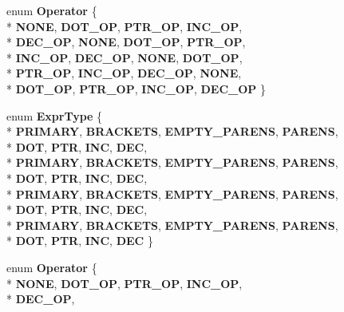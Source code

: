 \begin{DoxyCompactItemize}
enum {\bfseries Operator} \{ \\*
{\bfseries N\-O\-N\-E}, 
{\bfseries D\-O\-T\-\_\-\-O\-P}, 
{\bfseries P\-T\-R\-\_\-\-O\-P}, 
{\bfseries I\-N\-C\-\_\-\-O\-P}, 
\\*
{\bfseries D\-E\-C\-\_\-\-O\-P}, 
{\bfseries N\-O\-N\-E}, 
{\bfseries D\-O\-T\-\_\-\-O\-P}, 
{\bfseries P\-T\-R\-\_\-\-O\-P}, 
\\*
{\bfseries I\-N\-C\-\_\-\-O\-P}, 
{\bfseries D\-E\-C\-\_\-\-O\-P}, 
{\bfseries N\-O\-N\-E}, 
{\bfseries D\-O\-T\-\_\-\-O\-P}, 
\\*
{\bfseries P\-T\-R\-\_\-\-O\-P}, 
{\bfseries I\-N\-C\-\_\-\-O\-P}, 
{\bfseries D\-E\-C\-\_\-\-O\-P}, 
{\bfseries N\-O\-N\-E}, 
\\*
{\bfseries D\-O\-T\-\_\-\-O\-P}, 
{\bfseries P\-T\-R\-\_\-\-O\-P}, 
{\bfseries I\-N\-C\-\_\-\-O\-P}, 
{\bfseries D\-E\-C\-\_\-\-O\-P}
 \}
\item 
enum {\bfseries Expr\-Type} \{ \\*
{\bfseries P\-R\-I\-M\-A\-R\-Y}, 
{\bfseries B\-R\-A\-C\-K\-E\-T\-S}, 
{\bfseries E\-M\-P\-T\-Y\-\_\-\-P\-A\-R\-E\-N\-S}, 
{\bfseries P\-A\-R\-E\-N\-S}, 
\\*
{\bfseries D\-O\-T}, 
{\bfseries P\-T\-R}, 
{\bfseries I\-N\-C}, 
{\bfseries D\-E\-C}, 
\\*
{\bfseries P\-R\-I\-M\-A\-R\-Y}, 
{\bfseries B\-R\-A\-C\-K\-E\-T\-S}, 
{\bfseries E\-M\-P\-T\-Y\-\_\-\-P\-A\-R\-E\-N\-S}, 
{\bfseries P\-A\-R\-E\-N\-S}, 
\\*
{\bfseries D\-O\-T}, 
{\bfseries P\-T\-R}, 
{\bfseries I\-N\-C}, 
{\bfseries D\-E\-C}, 
\\*
{\bfseries P\-R\-I\-M\-A\-R\-Y}, 
{\bfseries B\-R\-A\-C\-K\-E\-T\-S}, 
{\bfseries E\-M\-P\-T\-Y\-\_\-\-P\-A\-R\-E\-N\-S}, 
{\bfseries P\-A\-R\-E\-N\-S}, 
\\*
{\bfseries D\-O\-T}, 
{\bfseries P\-T\-R}, 
{\bfseries I\-N\-C}, 
{\bfseries D\-E\-C}, 
\\*
{\bfseries P\-R\-I\-M\-A\-R\-Y}, 
{\bfseries B\-R\-A\-C\-K\-E\-T\-S}, 
{\bfseries E\-M\-P\-T\-Y\-\_\-\-P\-A\-R\-E\-N\-S}, 
{\bfseries P\-A\-R\-E\-N\-S}, 
\\*
{\bfseries D\-O\-T}, 
{\bfseries P\-T\-R}, 
{\bfseries I\-N\-C}, 
{\bfseries D\-E\-C}
 \}
\item 
enum {\bfseries Operator} \{ \\*
{\bfseries N\-O\-N\-E}, 
{\bfseries D\-O\-T\-\_\-\-O\-P}, 
{\bfseries P\-T\-R\-\_\-\-O\-P}, 
{\bfseries I\-N\-C\-\_\-\-O\-P}, 
\\*
{\bfseries D\-E\-C\-\_\-\-O\-P}, 

\end{DoxyCompactItemize}
